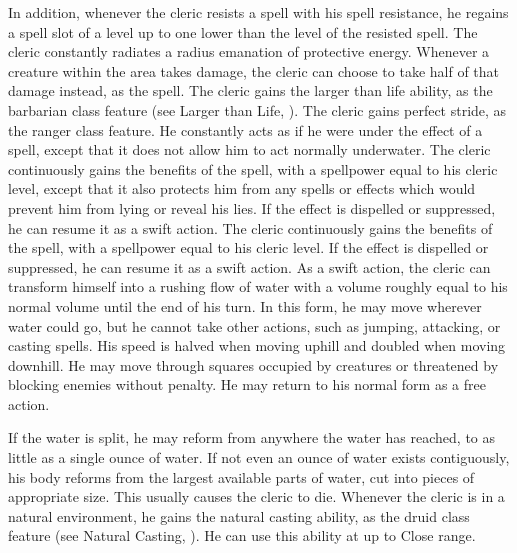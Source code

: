     In addition, whenever the cleric resists a spell with his spell resistance, he regains a spell slot of a level up to one lower than the level of the resisted spell.
    The cleric constantly radiates a \areamed radius emanation of protective energy.
    Whenever a creature within the area takes damage, the cleric can choose to take half of that damage instead, as the  spell.
    The cleric gains the larger than life ability, as the barbarian class feature (see Larger than Life, ).
    The cleric gains perfect stride, as the ranger class feature.
    He constantly acts as if he were under the effect of a  spell, except that it does not allow him to act normally underwater.
     The cleric continuously gains the benefits of the 
    spell, with a spellpower equal to his cleric level, except that it also protects him from any spells or effects which would prevent him from lying or reveal his lies.
    If the effect is dispelled or suppressed, he can resume it as a swift action.
     The cleric continuously gains the benefits of the 
    spell, with a spellpower equal to his cleric level.
    If the effect is dispelled or suppressed, he can resume it as a swift action.
    As a swift action, the cleric can transform himself into a rushing flow of water with a volume roughly equal to his normal volume until the end of his turn.
    In this form, he may move wherever water could go, but he cannot take other actions, such as jumping, attacking, or casting spells.
    His speed is halved when moving uphill and doubled when moving downhill.
    He may move through squares occupied by creatures or threatened by blocking enemies without penalty.
    He may return to his normal form as a free action.
    \par If the water is split, he may reform from anywhere the water has reached, to as little as a single ounce of water.
    If not even an ounce of water exists contiguously, his body reforms from the largest available parts of water, cut into pieces of appropriate size.
    This usually causes the cleric to die.
    Whenever the cleric is in a natural environment, he gains the natural casting ability, as the druid class feature (see Natural Casting, ).
    He can use this ability at up to Close range.

